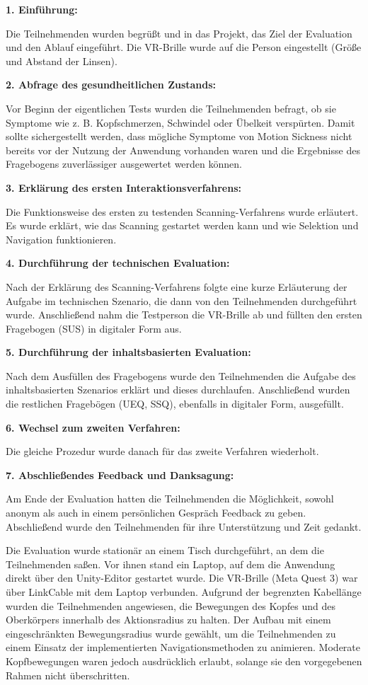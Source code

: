 {\normalfont \bfseries 1. Einführung:}

Die Teilnehmenden wurden begrüßt und in das Projekt, das Ziel der Evaluation und den Ablauf eingeführt. Die VR-Brille wurde auf die Person eingestellt (Größe und Abstand der Linsen). 

{\normalfont \bfseries 2. Abfrage des gesundheitlichen Zustands:}

Vor Beginn der eigentlichen Tests wurden die Teilnehmenden befragt, ob sie Symptome wie z. B.  Kopfschmerzen, Schwindel oder Übelkeit verspürten. Damit sollte sichergestellt werden, dass mögliche Symptome von Motion Sickness nicht bereits vor der Nutzung der Anwendung vorhanden waren und die Ergebnisse des Fragebogens zuverlässiger ausgewertet werden können. 

{\normalfont \bfseries 3. Erklärung des ersten Interaktionsverfahrens:}

Die Funktionsweise des ersten zu testenden Scanning-Verfahrens wurde erläutert. Es wurde erklärt, wie das Scanning gestartet werden kann und wie Selektion und Navigation funktionieren. 

{\normalfont \bfseries 4. Durchführung der technischen Evaluation:}

Nach der Erklärung des Scanning-Verfahrens folgte eine kurze Erläuterung der Aufgabe im technischen Szenario, die dann von den Teilnehmenden durchgeführt wurde. Anschließend nahm die Testperson die VR-Brille ab und füllten den ersten Fragebogen (SUS) in digitaler Form aus. 

{\normalfont \bfseries 5. Durchführung der inhaltsbasierten Evaluation:}

Nach dem Ausfüllen des Fragebogens wurde den Teilnehmenden die Aufgabe des inhaltsbasierten Szenarios erklärt und dieses durchlaufen. Anschließend wurden die restlichen Fragebögen (UEQ, SSQ), ebenfalls in digitaler Form, ausgefüllt.

{\normalfont \bfseries 6. Wechsel zum zweiten Verfahren:}

Die gleiche Prozedur wurde danach für das zweite Verfahren wiederholt.

{\normalfont \bfseries 7. Abschließendes Feedback und Danksagung:}

Am Ende der Evaluation hatten die Teilnehmenden die Möglichkeit, sowohl anonym als auch in einem persönlichen Gespräch Feedback zu geben. Abschließend wurde den Teilnehmenden für ihre Unterstützung und Zeit gedankt. 

Die Evaluation wurde stationär an einem Tisch durchgeführt, an dem die Teilnehmenden saßen. Vor ihnen stand ein Laptop, auf dem die Anwendung direkt über den Unity-Editor gestartet wurde. Die VR-Brille (Meta Quest 3) war über LinkCable mit dem Laptop verbunden. Aufgrund der begrenzten Kabellänge wurden die Teilnehmenden angewiesen, die Bewegungen des Kopfes und des Oberkörpers innerhalb des Aktionsradius zu halten.  Der Aufbau mit einem eingeschränkten Bewegungsradius wurde gewählt, um die Teilnehmenden zu einem Einsatz der implementierten Navigationsmethoden zu animieren. Moderate Kopfbewegungen waren jedoch ausdrücklich erlaubt, solange sie den vorgegebenen Rahmen nicht überschritten.

